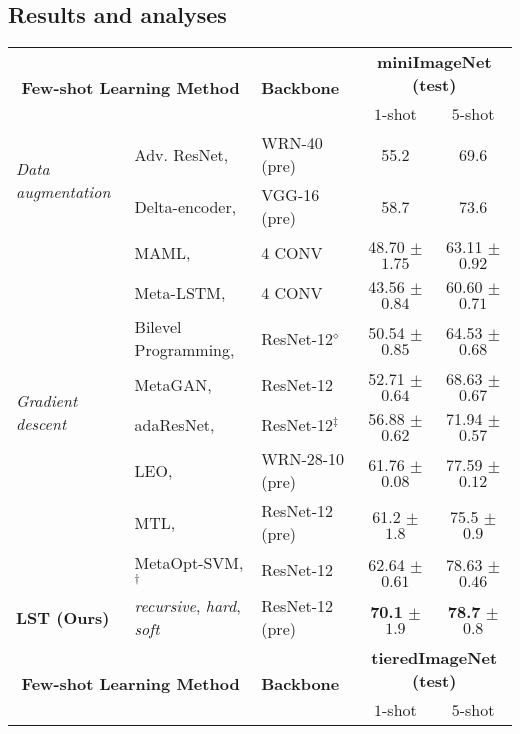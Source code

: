 \documentclass{article}
\begin{document}
\subsection{Results and analyses}
\begin{table*}
  \small
  \centering
  \begin{tabular}{l l lcc}
    \toprule
     \multicolumn{2}{c}{\multirow{2}{*}{\textbf{Few-shot Learning Method}}} & \multirow{2}{*}{\textbf{Backbone}} &  \multicolumn{2}{c}{\textbf{miniImageNet (test)}} \\
     &&& $1$-shot & $5$-shot \\
    \midrule
    \multirow{2}{*}{\emph{Data augmentation}}
    & Adv. ResNet, \cite{Mehrotra2017} & WRN-40 (pre) & 55.2 & 69.6 \\
    & Delta-encoder, \cite{SchwartzNIPS18} & VGG-16 (pre) & 58.7 & 73.6 \\
    \midrule  
    \multirow{8}{*}{\emph{Gradient descent}}
    & MAML, \cite{FinnAL17} & 4 CONV & 48.70 $\pm$ $1.75$ & 63.11 $\pm$ $0.92$ \\
    & Meta-LSTM, \cite{RaviICLR2017} & 4 CONV & 43.56 $\pm$ $0.84$ & 60.60 $\pm$ $0.71$ \\
    & Bilevel Programming, \cite{FranceschiICML18} & ResNet-12${}^{\diamond}$   & 50.54 $\pm$ $0.85$  & 64.53 $\pm$ $0.68$\\
    & MetaGAN, \cite{ZhangNIPS2018MetaGAN} & ResNet-12 & 52.71 $\pm$ $0.64$  & 68.63 $\pm$ $0.67$ \\
    & adaResNet, \cite{MunkhdalaiICML18} & ResNet-12${}^{\ddag}$   & 56.88 $\pm$ $0.62$ & 71.94 $\pm$ $0.57$ \\
    & LEO, \cite{RusuICLR2019} & WRN-28-10 (pre) & 61.76 $\pm$ $0.08$ & 77.59 $\pm$ $0.12$ \\
    & MTL, \cite{SunCVPR2019} & ResNet-12 (pre) & 61.2 $\pm$ $1.8$  & 75.5 $\pm$ $0.9$ \\
    & MetaOpt-SVM, \cite{LeeCVPR19svm}${}^{\dag}$ & ResNet-12 & 62.64 $\pm$ $0.61$  & 78.63 $\pm$ $0.46$ \\
    \midrule
\textbf{LST (Ours)} & \emph{recursive}, \emph{hard}, \emph{soft} & ResNet-12 (pre) & \textbf{70.1} $\pm$ $1.9$  & \textbf{78.7} $\pm$ $0.8$  \\
    \midrule\midrule
    \multicolumn{2}{c}{\multirow{2}{*}{\textbf{Few-shot Learning Method}}} & \multirow{2}{*}{\textbf{Backbone}} &  \multicolumn{2}{c}{\textbf{tieredImageNet (test)}} \\
     &&& $1$-shot & $5$-shot \\
    \midrule

\end{tabular}
\end{table*}
\end{document}
